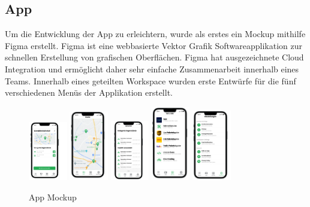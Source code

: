\subsection{App}

Um die Entwicklung der App zu erleichtern, wurde als erstes ein Mockup mithilfe Figma erstellt. Figma ist eine webbasierte Vektor Grafik Softwareapplikation zur schnellen Erstellung von grafischen Oberflächen. Figma hat ausgezeichnete Cloud Integration und ermöglicht daher sehr einfache Zusammenarbeit innerhalb eines Teams. Innerhalb eines geteilten Workspace wurden erste Entwürfe für die fünf verschiedenen Menüs der Applikation erstellt.

\begin{figure}[h]
  \centering
  \includegraphics[width=0.15\textwidth]{images/app_mock_tower}
  \includegraphics[width=0.15\textwidth]{images/app_mock_map}
  \includegraphics[width=0.15\textwidth]{images/app_mock_objects}
  \includegraphics[width=0.15\textwidth]{images/app_mock_services}
  \includegraphics[width=0.15\textwidth]{images/app_mock_settings}
  \caption{App Mockup}
  \label{fig:app_mockup}
\end{figure}











